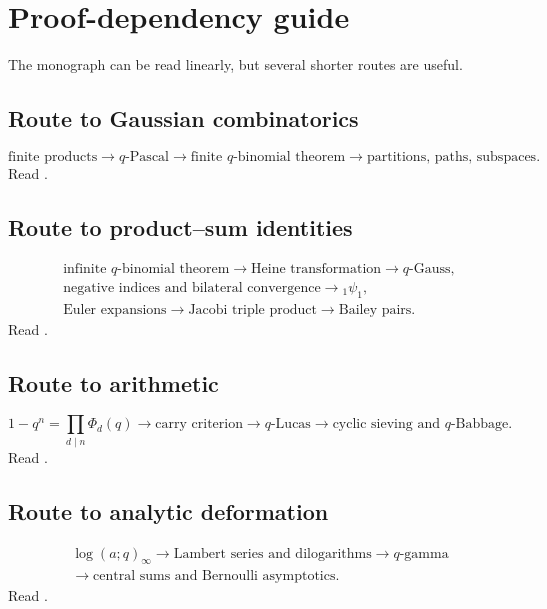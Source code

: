 \documentclass[11pt,oneside,openany]{book}
\theoremstyle{definition}
\theoremstyle{remark}
\begin{document}
\chapter{Proof-dependency guide}\label{app:dependencies}

The monograph can be read linearly, but several shorter routes are useful.

\section*{Route to Gaussian combinatorics}
\[
 \text{finite products}
 \longrightarrow q\text{-Pascal}
 \longrightarrow \text{finite }q\text{-binomial theorem}
 \longrightarrow \text{partitions, paths, subspaces}.
\]
Read .

\section*{Route to product--sum identities}
\[
\begin{gathered}
 \text{infinite }q\text{-binomial theorem}
 \longrightarrow \text{Heine transformation}
 \longrightarrow q\text{-Gauss},\\
 \text{negative indices and bilateral convergence}
 \longrightarrow {}_1\psi_1,\\
 \text{Euler expansions}
 \longrightarrow \text{Jacobi triple product}
 \longrightarrow \text{Bailey pairs}.
\end{gathered}
\]
Read .

\section*{Route to arithmetic}
\[
 1-q^n=\prod_{d\mid n}\Phi_d(q)
 \longrightarrow \text{carry criterion}
 \longrightarrow q\text{-Lucas}
 \longrightarrow \text{cyclic sieving and }q\text{-Babbage}.
\]
Read .

\section*{Route to analytic deformation}
\[
\begin{gathered}
 \log(a;q)_\infty
 \longrightarrow \text{Lambert series and dilogarithms}
 \longrightarrow q\text{-gamma}\\
 \longrightarrow \text{central sums and Bernoulli asymptotics}.
\end{gathered}
\]
Read .
\end{document}
